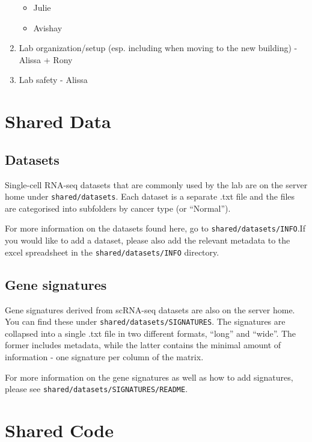 \documentclass[]{book}
\providecommand{\tightlist}{%
  \setlength{\itemsep}{0pt}\setlength{\parskip}{0pt}}
\begin{document}
\begin{enumerate}
  \begin{itemize}
  \tightlist
  \item
    Julie
  \item
    Avishay
  \end{itemize}
\item
  Lab organization/setup (esp. including when moving to the new
  building) - Alissa + Rony
\item
  Lab safety - Alissa
\end{enumerate}

\chapter{Shared Data}\label{sharedData}

\section{Datasets}\label{datasets}

Single-cell RNA-seq datasets that are commonly used by the lab are on
the server home under \texttt{shared/datasets}. Each dataset is a
separate .txt file and the files are categorised into subfolders by
cancer type (or ``Normal'').

For more information on the datasets found here, go to
\texttt{shared/datasets/INFO}.If you would like to add a dataset, please
also add the relevant metadata to the excel spreadsheet in the
\texttt{shared/datasets/INFO} directory.

\section{Gene signatures}\label{gene-signatures}

Gene signatures derived from scRNA-seq datasets are also on the server
home. You can find these under \texttt{shared/datasets/SIGNATURES}. The
signatures are collapsed into a single .txt file in two different
formats, ``long'' and ``wide''. The former includes metadata, while the
latter contains the minimal amount of information - one signature per
column of the matrix.

For more information on the gene signatures as well as how to add
signatures, please see \texttt{shared/datasets/SIGNATURES/README}.

\chapter{Shared Code}\label{sharedCode}
\end{document}
